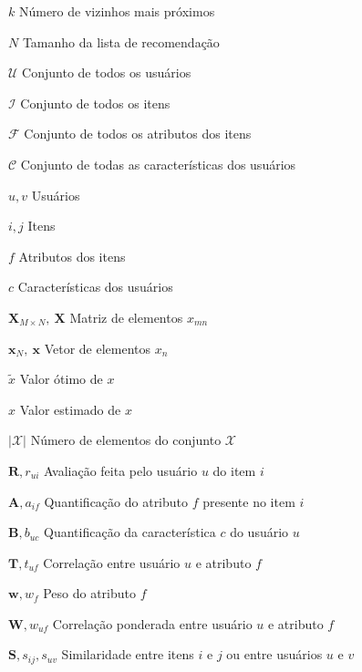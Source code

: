 \begin{simbolos}\label{simbolos}
    \item[$k$]  Número de vizinhos mais próximos 
    \item[$N$] Tamanho da lista de recomendação  
    \item[$\mathcal{U}$] Conjunto de todos os usuários 
    \item[$\mathcal{I}$] Conjunto de todos os itens  
    \item[$\mathcal{F}$] Conjunto  de todos os atributos dos itens
    \item[$\mathcal{C}$] Conjunto  de todas as características dos usuários
    \item[$u, v$] Usuários 
    \item[$i, j$] Itens 
    \item[$f$] Atributos dos itens 
    \item[$c $] Características dos usuários  
    \item[$\mathbf{X}_{M \times N},~\mathbf{X}$] Matriz de elementos $x_{mn}$ 
    \item[$\mathbf{x}_{N},~\mathbf{x}$] Vetor de elementos $x_{n}$
    \item[$\tilde{x}$] Valor ótimo de $x$
    \item[$\hat{x}$] Valor estimado de $x$
    \item[$|\mathcal{X}|$] Número de elementos do conjunto $\mathcal{X}$
    \item[$\mathbf{R}, r_{ui}$] Avaliação feita pelo usuário $u$ do item $i$
    \item[$\mathbf{A}, a_{if}$] Quantificação do atributo $f$ presente no item $i$
    \item[$\mathbf{B}, b_{uc}$] Quantificação da característica $c$ do usuário $u$   
    \item[$\mathbf{T}, t_{uf}$] Correlação entre usuário $u$ e atributo $f$
    \item[$\mathbf{w}, w_{f}$] Peso do atributo $f$
    \item[$\mathbf{W}, w_{uf}$] Correlação ponderada entre usuário $u$ e atributo $f$ 
    \item[$\mathbf{S}, s_{ij}, s_{uv}$] Similaridade entre itens $i$ e $j$ ou entre usuários $u$ e $v$
\end{simbolos}
